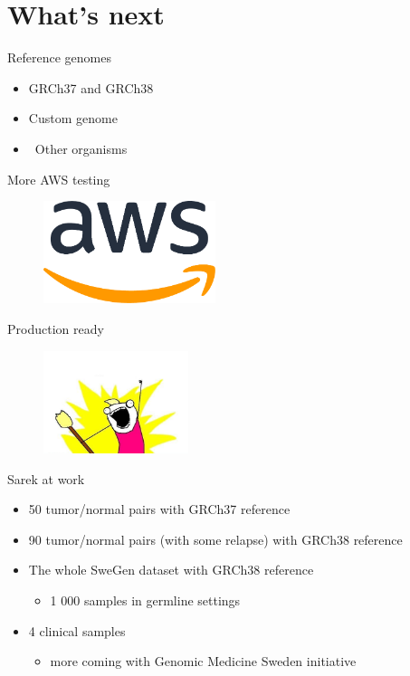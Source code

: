 \documentclass[usepdftitle=false]{beamer}
\begin{document}
\section{What's next}

\begin{frame}{Reference genomes}
	\begin{itemize}
		\item GRCh37 and GRCh38
		\pause
		\item Custom genome
		\pause
		\item \faWrench\ Other organisms
	\end{itemize}
\end{frame}

\begin{frame}{More AWS testing}
	\begin{figure}
		\includegraphics[height=3cm]{pictures/AWS}
	\end{figure}
\end{frame}

\begin{frame}{Production ready}
	\begin{figure}
		\includegraphics[height=3cm]{pictures/X-All-The-Y.jpg}
	\end{figure}
\end{frame}

\begin{frame}{Sarek at work}
	\begin{itemize}
		\item	50 tumor/normal pairs with GRCh37 reference
		\pause
		\item	90 tumor/normal pairs (with some relapse) with GRCh38 reference
		\pause
		\item	The whole SweGen dataset with GRCh38 reference
		\begin{itemize}
			\item	1 000 samples in germline settings
		\end{itemize}
		\pause
		\item	4 clinical samples
		\begin{itemize}
			\item	more coming with Genomic Medicine Sweden initiative
		\end{itemize}
	\end{itemize}
\end{frame}
\end{document}
